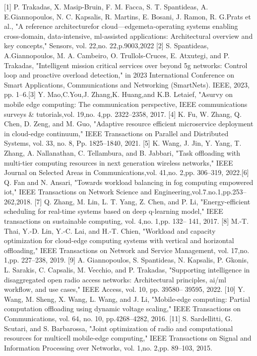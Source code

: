 \documentclass{article}
\begin{document}
[1] P. Trakadas, X. Masip-Bruin, F. M. Facca, S. T. Spantideas, A. E.Giannopoulos, N. C. Kapsalis, R. Martins, E. Bosani, J. Ramon, R. G.Prats et al., "A reference architecturefor cloud—edgemeta-operating systems enabling cross-domain, data-intensive, ml-assisted applications: Architectural overview and key concepts," Sensors, vol. 22,no. 22,p.9003,2022
[2] S. Spantideas, A.Giannopoulos, M. A. Cambeiro, O. Trullols-Cruces,
E. Atxutegi, and P. Trakadas, "Intelligent mission critical services over beyond 5g networks: Control loop and proactive overload detection,"
in 2023 International Conference on Smart Applications, Communications and Networking (SmartNets). IEEE, 2023, pp. 1–6.[3] Y. Mao,C.You,J. Zhang,K. Huang,and K.B. Letaief, "Asurvy on mobile edge computing: The communication perspective,  IEEE communications surveys \& tutorials,vol. 19,no. 4,pp. 2322–2358,
2017.
[4] K. Fu, W. Zhang, Q. Chen, D. Zeng, and M. Guo, "Adaptive resource efficient microservice deployment in cloud-edge continuum," IEEE Transactions on Parallel and Distributed Systems, vol. 33, no. 8, Pp.
1825–1840, 2021.
[5] K. Wang, J. Jin, Y. Yang, T. Zhang, A. Nallanathan, C. Tellambura,
and B. Jabbari, "Task offloading with multi-tier computing resources in next generation wireless networks," IEEE Journal on Selected Areas in Communications,vol. 41,no. 2,pp. 306–319, 2022.[6] Q. Fan and N. Ansari, "Towards workload balancing in fog computing empowered iot," IEEE Transactions on Network Science and Engineering,vol.7.no.1,pp.253–262,2018.
[7] Q. Zhang, M. Lin, L. T. Yang, Z. Chen, and P. Li, "Energy-efficient scheduling for real-time systems based on deep q-learning model,"
IEEE transactions on sustainable computing, vol. 4,no. 1,pp. 132–
141, 2017.
[8] M.-T. Thai, Y.-D. Lin, Y.-C. Lai, and H.-T. Chien, "Workload and capacity optimization for cloud-edge computing systems with vertical and horizontal offloading," IEEE Transactions on Network and Service Management, vol. 17,no. 1,pp. 227–238, 2019.
[9] A. Giannopoulos, S. Spantideas, N. Kapsalis, P. Gkonis, L. Sarakis,
C. Capsalis, M. Vecchio, and P. Trakadas, "Supporting intelligence in disaggregated open radio access networks: Architectural principles,
ai/ml workflow, and use cases," IEEE Access, vol. 10, pp. 39580–
39595, 2022.
[10] Y. Wang, M. Sheng, X. Wang, L. Wang, and J. Li, "Mobile-edge computing: Partial computation offloading using dynamic voltage scaling," IEEE Transactions on Communications, vol. 64, no. 10, pp.4268–4282, 2016.
[11] S. Sardellitti, G. Scutari, and S. Barbarossa, "Joint optimization of radio and computational resources for multicell mobile-edge computing," IEEE Transactions on Signal and Information Processing over Networks, vol. 1,no. 2,pp. 89–103, 2015.
\end{document}
